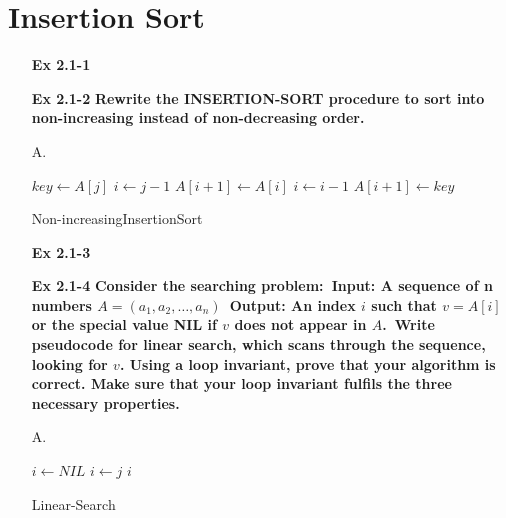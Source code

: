 \documentclass[fontsize=12pt,paper=a4,open=any]{book}
\begin{document}
\section{Insertion Sort}
\begin{enumerate}
	\item[\textbf{Ex 2.1-1}]

	\item[\textbf{Ex 2.1-2}]
		\textbf{Rewrite the INSERTION-SORT procedure to sort into non-increasing instead of non-decreasing order.} \

	\item[A.]
		\begin{algorithm}[H]

			{
				$key\longleftarrow A[j]$\;
				$i \longleftarrow j-1$\;
				{
					$A[i+ 1] \longleftarrow A[i]$\;
					$i \longleftarrow i-1$\;
				}
				$A[i+ 1] \longleftarrow key$\;
			}

			\caption{Non-increasingInsertionSort}
		\end{algorithm}
	\item[\textbf{Ex 2.1-3}]
	
	\item[\textbf{Ex 2.1-4}]
		\textbf{Consider the searching problem:\
			Input: A sequence of n numbers $A =(a_1, a_2,\dots,a_n)$\
			Output: An index $i$ such that $v=A[i]$ or the special value NIL if $v$ does not appear in $A$.\
			Write pseudocode for linear search, which scans through the sequence, looking for $v$. Using a loop invariant, prove that your algorithm is correct. Make sure that your loop invariant fulfils the three necessary properties.
		}
	
	\item[A.]
		\begin{algorithm}[H]

			$i \longleftarrow NIL$\;
			\For{$j \longleftarrow 0$ \To $A.length-1$}
			{
				{
					$i \longleftarrow j$\;
					\Break\;
				}
			}
			\Return $i$

			\caption{Linear-Search}
		\end{algorithm}


\end{enumerate}
\end{document}
